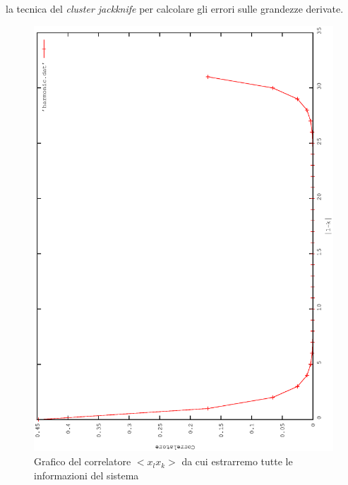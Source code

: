 la tecnica del \emph{cluster jackknife} per calcolare gli errori sulle grandezze derivate.\\
\begin{figure}[h]
 \centering
 \includegraphics[width= 0.7\columnwidth,angle= -90]{harmonic_giusto.eps}
 \caption{\small{Grafico del correlatore $<x_l x_k>$ da cui estrarremo tutte le informazioni del sistema}}
 \end{figure}

